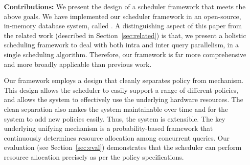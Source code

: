%
\textbf{Contributions:} We present the design of a scheduler framework that meets the above goals. 
We have implemented our scheduler framework in an open-source, in-memory database system, called \sys{}.
A distinguishing aspect of this paper from the related work (described in Section~\ref{sec:related}) is that, we present a holistic scheduling framework to deal with both intra and inter query parallelism, in a single scheduling algorithm. 
Therefore, our framework is far more comprehensive and more broadly applicable than previous work.

Our framework employs a design that cleanly separates policy from mechanism. 
This design allows the scheduler to easily support a range of  different policies, and allows the system to effectively use the underlying hardware resources. 
The clean separation also makes the system maintainable over time and for the system to add new policies easily. 
Thus, the system is extensible. 
The key underlying unifying mechanism is a probability-based framework that continuously determines resource allocation among concurrent queries.
Our evaluation (see Section~\ref{sec:eval}) demonstrates that the scheduler can perform resource allocation precisely as per the policy specifications. 

